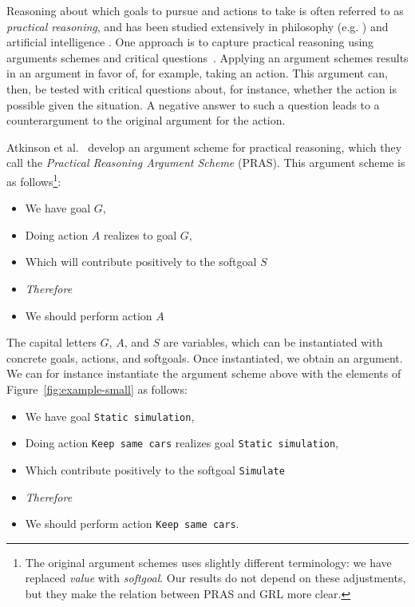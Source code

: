 Reasoning about which goals to pursue and actions to take is often referred to as \emph{practical reasoning}, and has been studied extensively in philosophy (e.g. \cite{Raz1978-RAZPR,walton1990}) and artificial intelligence \cite{bratman1987,atkinson2007}. One approach is to capture practical reasoning using arguments schemes and critical questions~\cite{walton1990}. Applying an argument schemes results in an argument in favor of, for example, taking an action. This argument can, then, be tested with critical questions about, for instance, whether the action is possible given the situation. A negative answer to such a question leads to a counterargument to the original argument for the action. 

Atkinson et al.~\cite{atkinson2007} develop an argument scheme for practical reasoning, which they call the \emph{Practical Reasoning Argument Scheme} (PRAS). This argument scheme is as follows\footnote{The original argument schemes uses slightly different terminology: we have replaced \emph{value} with \emph{softgoal}. Our results do not depend on these adjustments, but they make the relation between PRAS and GRL more clear.}:

\begin{itemize}
\item[] We have goal $G$,
\item[] Doing action $A$ realizes to goal $G$,
\item[] Which will contribute positively to the softgoal $S$
\item[] \textit{Therefore} 
\item[] We should perform action $A$
\end{itemize}

The capital letters $G$, $A$, and $S$ are variables, which can be instantiated with concrete goals, actions, and softgoals. Once instantiated, we obtain an argument. We can for instance instantiate the argument scheme above with the elements of Figure~\ref{fig:example-small} as follows: %
\begin{itemize}
\item[] We have goal \texttt{Static simulation},
\item[] Doing action \texttt{Keep same cars} realizes goal \texttt{Static simulation}, 
\item[] Which contribute positively to the softgoal \texttt{Simulate} 
\item[] \textit{Therefore} 
\item[] We should perform action \texttt{Keep same cars}.
\end{itemize}

